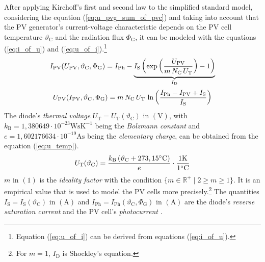 After applying Kirchoff's first and second law to the simplified standard model, considering the equation (\ref{eq:u_pvg_sum_of_pvc}) and taking into account that the PV generator's current-voltage characteristic depends on the PV cell temperature $\vartheta_{\mathrm{C}}$ and the radiation flux $\Phi_{\mathrm{G}}$, it can be modeled with the equations (\ref{eq:i_of_u}) and (\ref{eq:u_of_i}).\footnote{Equation (\ref{eq:u_of_i}) can be derived from equations (\ref{eq:i_of_u}).}
	\begin{equation} \label{eq:i_of_u}
	\centering
		I_{\mathrm{PV}}(U_{\mathrm{PV}}, \vartheta_{\mathrm{C}}, \Phi_{\mathrm{G}}) = I_{\mathrm{Ph}} - \underbrace{I_{\mathrm{S}} \left( \exp \left(\frac{U_{\mathrm{PV}}}{m \, N_{\mathrm{C}} \, U_{\mathrm{T}} } \right) - 1  \right)}_{I_{\mathrm{D}}}
	\end{equation}
	\begin{equation} \label{eq:u_of_i}
	\centering
		U_{\mathrm{PV}}(I_{\mathrm{PV}}, \vartheta_{\mathrm{C}}, \Phi_{\mathrm{G}}) = m \, N_{\mathrm{C}} \, U_{\mathrm{T}} \, \ln \left( \frac{I_{\mathrm{Ph}} - I_{\mathrm{PV}} + I_{\mathrm{S}}}{I_{\mathrm{S}}} \right)
	\end{equation}
The diode's \emph{thermal voltage} $U_{\mathrm{T}} = U_{\mathrm{T}}(\vartheta_{\mathrm{C}})$ in $\left( \mathrm{V} \right)$, with $k_\mathrm{B} = 1,380649 \cdot 10^{-23} \mathrm{WsK^{-1}}$ being the \emph{Bolzmann constant} and $e = 1,602176634\cdot10^{-19} \mathrm{As}$ being the \emph{elementary charge}, can be obtained from the equation (\ref{eq:u_temp}).
	\begin{equation} \label{eq:u_temp}
	\centering
		U_{\mathrm{T}}(\vartheta_{\mathrm{C}}) = \frac{ k_\mathrm{B} \left( \vartheta_{\mathrm{C}} + 273,15^\circ \mathrm{C} \right) }{e} \cdot \frac{\mathrm{1K}}{1^\circ \mathrm{C}}
	\end{equation}
$m$ in $\left( 1 \right)$ is the \emph{ideality factor} with the condition $\{m \in \mathbb{R}^+ \mid 2 \geq m \geq 1 \}$. It is an empirical value that is used to model the PV cells more precisely.\footnote{For $m = 1$, $I_\mathrm{D}$ is Shockley's equation.} The quantities $I_{\mathrm{S}} = I_{\mathrm{S}}(\vartheta_{\mathrm{C}})$ in $\left( \mathrm{A} \right)$ and $I_{\mathrm{Ph}} = I_{\mathrm{Ph}}(\vartheta_{\mathrm{C}}, \Phi_{\mathrm{G}})$ in $\left( \mathrm{A} \right)$ are the diode's \emph{reverse saturation current} and the PV cell's \emph{photocurrent} \cite{Prechtl:2006, Mertens:2015, Tietze:2016, Wagner:2018, Elert:2020}. 

